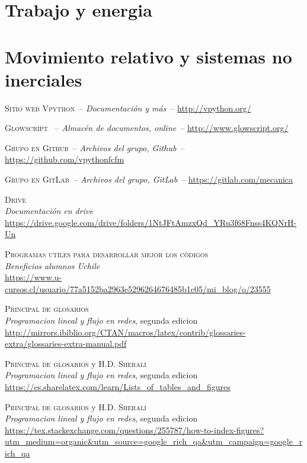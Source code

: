\documentclass[letterpaper,12pt]{article}
\begin{document}
\section{Trabajo y energia}

\section{Movimiento relativo y sistemas no inerciales}



\newpage
\begin{thebibliography}{X}
	 \textsc{Sitio web Vpython}\ --	\textit{Documentación y más}\ -- 	\url{http://vpython.org/}

	 \textsc{Glowscript} \ --	\textit{Almacén de documentos, online}\ --  	\url{http://www.glowscript.org/}

	 \textsc{Grupo en Github}\ --  	\textit{Archivos del grupo, Github}\ -- 	\url{https://github.com/vpythonfcfm}

	 \textsc{Grupo en GitLab}\ --  	\textit{Archivos del grupo, GitLab}\ -- 	\url{https://gitlab.com/mecanica}

	 \textsc{Drive}\\
	\textit{Documentación en drive}\\
	\url{https://drive.google.com/drive/folders/1NtJFtAmzxQd_YRu3f68Fnss4KQNrH-Un}

	 \textsc{Programas utiles para desarrollar mejor los códigos}\\
	\textit{Beneficios alumnos Uchile}\\
	\url{https://www.u-cursos.cl/usuario/77a5152ba2963e5296264676485b1c05/mi_blog/o/23555}

	 \textsc{Principal de glosarios}\\
	\textit{Programacion lineal y flujo en redes}, segunda edicion\\
	\url{http://mirrors.ibiblio.org/CTAN/macros/latex/contrib/glossaries-extra/glossaries-extra-manual.pdf}

	 \textsc{Principal de glosarios} y \textsc{H.D. Sherali}\\
	\textit{Programacion lineal y flujo en redes}, segunda edicion\\
	\url{https://es.sharelatex.com/learn/Lists_of_tables_and_figures}

	 \textsc{Principal de glosarios} y \textsc{H.D. Sherali}\\
	\textit{Programacion lineal y flujo en redes}, segunda edicion\\
	\url{https://tex.stackexchange.com/questions/255787/how-to-index-figures?utm_medium=organic&utm_source=google_rich_qa&utm_campaign=google_rich_qa}


\end{thebibliography}
\end{document}
